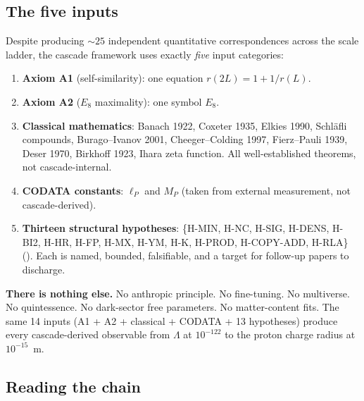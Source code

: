 \documentclass[11pt]{article}
\theoremstyle{plain}
\theoremstyle{definition}
\theoremstyle{remark}
\begin{document}
\subsection{The five inputs}\label{app:chain-inputs}

Despite producing $\sim 25$ independent quantitative correspondences across the scale ladder, the cascade framework uses exactly \emph{five} input categories:

\begin{enumerate}[leftmargin=2em]
\item \textbf{Axiom A1} (self-similarity): one equation $r(2L) = 1 + 1/r(L)$.
\item \textbf{Axiom A2} ($E_8$ maximality): one symbol $E_8$.
\item \textbf{Classical mathematics}: Banach 1922, Coxeter 1935, Elkies 1990, Schl\"afli compounds, Burago--Ivanov 2001, Cheeger--Colding 1997, Fierz--Pauli 1939, Deser 1970, Birkhoff 1923, Ihara zeta function. All well-established theorems, not cascade-internal.
\item \textbf{CODATA constants}: $\ell_P$ and $M_P$ (taken from external measurement, not cascade-derived).
\item \textbf{Thirteen structural hypotheses}: \{H-MIN, H-NC, H-SIG, H-DENS, H-BI2, H-HR, H-FP, H-MX, H-YM, H-K, H-PROD, H-COPY-ADD, H-RLA\} (\citealp{SmartXXXVI}). Each is named, bounded, falsifiable, and a target for follow-up papers to discharge.
\end{enumerate}

\textbf{There is nothing else.} No anthropic principle. No fine-tuning. No multiverse. No quintessence. No dark-sector free parameters. No matter-content fits. The same 14 inputs (A1 + A2 + classical + CODATA + 13 hypotheses) produce every cascade-derived observable from $\Lambda$ at $10^{-122}$ to the proton charge radius at $10^{-15}$~m.

\subsection{Reading the chain}\label{app:chain-reading}
\end{document}

